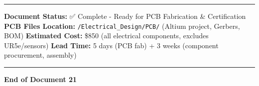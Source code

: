 \documentclass[
]{article}
\begin{document}
\begin{center}\rule{0.5\linewidth}{0.5pt}\end{center}

\textbf{Document Status:} ✅ Complete - Ready for PCB Fabrication \&
Certification \textbf{PCB Files Location:}
\texttt{/Electrical\_Design/PCB/} (Altium project, Gerbers, BOM)
\textbf{Estimated Cost:} \$850 (all electrical components, excludes
UR5e/sensors) \textbf{Lead Time:} 5 days (PCB fab) + 3 weeks (component
procurement, assembly)

\begin{center}\rule{0.5\linewidth}{0.5pt}\end{center}

\textbf{End of Document 21}
\end{document}
